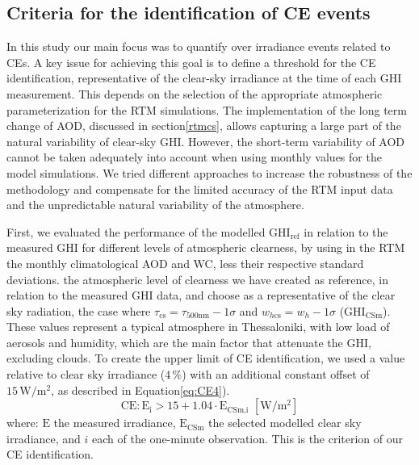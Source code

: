 \documentclass[preprint, 5p,
authoryear]{elsarticle} %
\begin{document}
\hypertarget{criteria-for-the-identification-of-ce-events}{%
\subsection{Criteria for the identification of CE
events}\label{criteria-for-the-identification-of-ce-events}}

In this study our main focus was to quantify over irradiance events
related to CEs. A key issue for achieving this goal is to define a
threshold for the CE identification, representative of the clear-sky
irradiance at the time of each GHI measurement. This depends on the
selection of the appropriate atmospheric parameterization for the RTM
simulations. The implementation of the long term change of AOD,
discussed in section\nobreakspace{}\ref{rtmcs}, allows capturing a large
part of the natural variability of clear-sky GHI. However, the
short-term variability of AOD cannot be taken adequately into account
when using monthly values for the model simulations. We tried different
approaches to increase the robustness of the methodology and compensate
for the limited accuracy of the RTM input data and the unpredictable
natural variability of the atmosphere.

First, we evaluated the performance of the modelled
\(\text{GHI}_\text{ref}\) in relation to the measured GHI for different
levels of atmospheric clearness, by using in the RTM the monthly
climatological AOD and WC, less their respective standard deviations.
the atmospheric level of clearness we have created as reference, in
relation to the measured GHI data, and choose as a representative of the
clear sky radiation, the case where
\(\tau_{\text{cs}} = \tau_{500\text{nm}} - 1\sigma\) and
\(w_{h\text{cs}} = w_h - 1\sigma\) (\(\text{GHI}_\text{CSm}\)). These
values represent a typical atmosphere in Thessaloniki, with low load of
aerosols and humidity, which are the main factor that attenuate the GHI,
excluding clouds. To create the upper limit of CE identification, we
used a value relative to clear sky irradiance (\(4\,\%\)) with an
additional constant offset of \(15\,\text{W}/\text{m}^2\), as described
in Equation\nobreakspace\ref{eq:CE4}). \begin{equation}
\text{CE} : \text{E}_\text{i} > 15 + 1.04 \cdot \text{E}_\text{CSm,i} \,\,[\text{W}/\text{m}^2] \label{eq:CE4}
\end{equation} where: \(\text{E}\) the measured irradiance,
\(\text{E}_\text{CSm}\) the selected modelled clear sky irradiance, and
\(i\) each of the one-minute observation. This is the criterion of our
CE identification.
\end{document}
